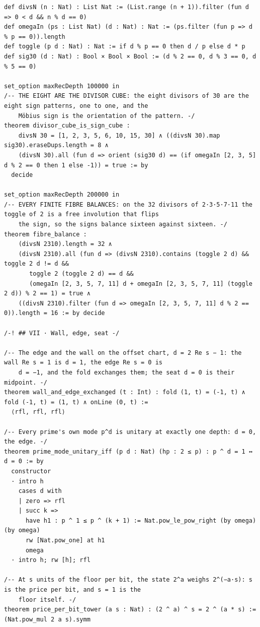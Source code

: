 \documentclass[10pt,twocolumn]{article}
\begin{document}
\begin{Verbatim}
def divsN (n : Nat) : List Nat := (List.range (n + 1)).filter (fun d => 0 < d && n % d == 0)
def omegaIn (ps : List Nat) (d : Nat) : Nat := (ps.filter (fun p => d % p == 0)).length
def toggle (p d : Nat) : Nat := if d % p == 0 then d / p else d * p
def sig30 (d : Nat) : Bool × Bool × Bool := (d % 2 == 0, d % 3 == 0, d % 5 == 0)

set_option maxRecDepth 100000 in
/-- THE EIGHT ARE THE DIVISOR CUBE: the eight divisors of 30 are the eight sign patterns, one to one, and the
    Möbius sign is the orientation of the pattern. -/
theorem divisor_cube_is_sign_cube :
    divsN 30 = [1, 2, 3, 5, 6, 10, 15, 30] ∧ ((divsN 30).map sig30).eraseDups.length = 8 ∧
    (divsN 30).all (fun d => orient (sig30 d) == (if omegaIn [2, 3, 5] d % 2 == 0 then 1 else -1)) = true := by
  decide

set_option maxRecDepth 200000 in
/-- EVERY FINITE FIBRE BALANCES: on the 32 divisors of 2·3·5·7·11 the toggle of 2 is a free involution that flips
    the sign, so the signs balance sixteen against sixteen. -/
theorem fibre_balance :
    (divsN 2310).length = 32 ∧
    (divsN 2310).all (fun d => (divsN 2310).contains (toggle 2 d) && toggle 2 d != d &&
       toggle 2 (toggle 2 d) == d &&
       (omegaIn [2, 3, 5, 7, 11] d + omegaIn [2, 3, 5, 7, 11] (toggle 2 d)) % 2 == 1) = true ∧
    ((divsN 2310).filter (fun d => omegaIn [2, 3, 5, 7, 11] d % 2 == 0)).length = 16 := by decide

/-! ## VII · Wall, edge, seat -/

/-- The edge and the wall on the offset chart, d = 2 Re s − 1: the wall Re s = 1 is d = 1, the edge Re s = 0 is
    d = −1, and the fold exchanges them; the seat d = 0 is their midpoint. -/
theorem wall_and_edge_exchanged (t : Int) : fold (1, t) = (-1, t) ∧ fold (-1, t) = (1, t) ∧ onLine (0, t) :=
  ⟨rfl, rfl, rfl⟩

/-- Every prime's own mode p^d is unitary at exactly one depth: d = 0, the edge. -/
theorem prime_mode_unitary_iff (p d : Nat) (hp : 2 ≤ p) : p ^ d = 1 ↔ d = 0 := by
  constructor
  · intro h
    cases d with
    | zero => rfl
    | succ k =>
      have h1 : p ^ 1 ≤ p ^ (k + 1) := Nat.pow_le_pow_right (by omega) (by omega)
      rw [Nat.pow_one] at h1
      omega
  · intro h; rw [h]; rfl

/-- At s units of the floor per bit, the state 2^a weighs 2^(−a·s): s is the price per bit, and s = 1 is the
    floor itself. -/
theorem price_per_bit_tower (a s : Nat) : (2 ^ a) ^ s = 2 ^ (a * s) := (Nat.pow_mul 2 a s).symm


\end{Verbatim}
\end{document}
